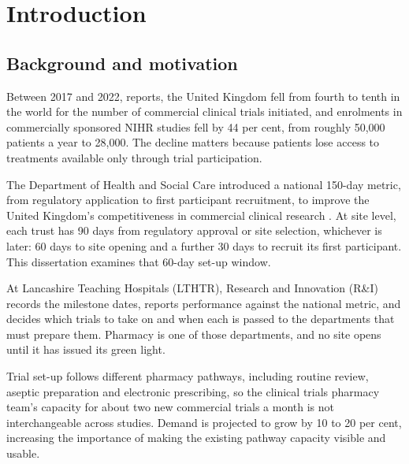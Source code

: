 
\chapter{Introduction}
\label{ch:intro}

\section{Background and motivation}
\label{sec:background}

Between 2017 and 2022, \citet{OShaughnessy2023Commercial} reports, the United Kingdom fell from fourth to tenth in the world for the number of commercial clinical trials initiated, and enrolments in commercially sponsored NIHR studies fell by 44 per cent, from roughly 50,000 patients a year to 28,000. The decline matters because patients lose access to treatments available only through trial participation.

The Department of Health and Social Care introduced a national 150-day metric, from regulatory application to first participant recruitment, to improve the United Kingdom's competitiveness in commercial clinical research \citep{anon2025Support}. At site level, each trust has 90 days from regulatory approval or site selection, whichever is later: 60 days to site opening and a further 30 days to recruit its first participant. This dissertation examines that 60-day set-up window.

At Lancashire Teaching Hospitals (LTHTR), Research and Innovation (R\&I) records the milestone dates, reports performance against the national metric, and decides which trials to take on and when each is passed to the departments that must prepare them. Pharmacy is one of those departments, and no site opens until it has issued its green light.

Trial set-up follows different pharmacy pathways, including routine review, aseptic preparation and electronic prescribing, so the clinical trials pharmacy team's capacity for about two new commercial trials a month is not interchangeable across studies. Demand is projected to grow by 10 to 20 per cent, increasing the importance of making the existing pathway capacity visible and usable.

